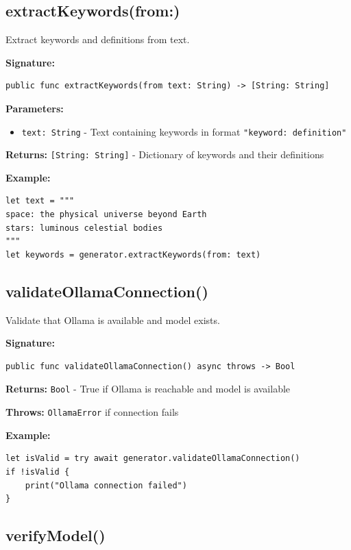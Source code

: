 \documentclass[11pt,a4paper]{article}
\begin{document}
\subsection{extractKeywords(from:)}

Extract keywords and definitions from text.

\textbf{Signature:}
\begin{lstlisting}
public func extractKeywords(from text: String) -> [String: String]
\end{lstlisting}

\textbf{Parameters:}
\begin{itemize}
    \item \texttt{text: String} - Text containing keywords in format \texttt{"keyword: definition"}
\end{itemize}

\textbf{Returns:} \texttt{[String: String]} - Dictionary of keywords and their definitions

\textbf{Example:}
\begin{lstlisting}
let text = """
space: the physical universe beyond Earth
stars: luminous celestial bodies
"""
let keywords = generator.extractKeywords(from: text)
\end{lstlisting}

\subsection{validateOllamaConnection()}

Validate that Ollama is available and model exists.

\textbf{Signature:}
\begin{lstlisting}
public func validateOllamaConnection() async throws -> Bool
\end{lstlisting}

\textbf{Returns:} \texttt{Bool} - True if Ollama is reachable and model is available

\textbf{Throws:} \texttt{OllamaError} if connection fails

\textbf{Example:}
\begin{lstlisting}
let isValid = try await generator.validateOllamaConnection()
if !isValid {
    print("Ollama connection failed")
}
\end{lstlisting}

\subsection{verifyModel()}
\end{document}
